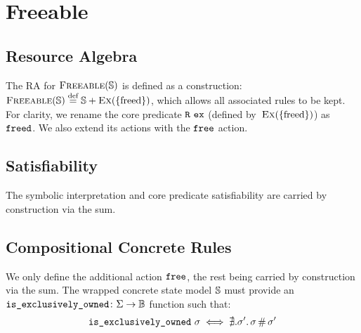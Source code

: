 

\section{Freeable} \label{rules:freeable}

\subsection{Resource Algebra}

The RA for $\textsc{Freeable}(\mathbb S)$ is defined as a construction: $\textsc{Freeable}(\mathbb S) \stackrel{\textnormal{def}}= \mathbb S + \textsc{Ex}(\{\text{freed}\})$, which allows all associated rules to be kept. For clarity, we rename the core predicate $\texttt{R}~\texttt{ex}$ (defined by~$\textsc{Ex}(\{\text{freed}\})$) as $\texttt{freed}$. We also extend its actions with the $\texttt{free}$ action.

\subsection{Satisfiability}

The symbolic interpretation and core predicate satisfiability are carried by construction via the sum.

\subsection{Compositional Concrete Rules}

We only define the additional action $\texttt{free}$, the rest being carried by construction via the sum. The wrapped concrete state model $\mathbb S$ must provide an ${\texttt{is\_exclusively\_owned}\colon\Sigma\rightarrow\mathbb{B}}$ function such that: \begin{align*}
	\texttt{is\_exclusively\_owned}~\sigma \iff \nexists. \sigma'\ldotp \sigma\operatorname{\#}\sigma'
\end{align*}

